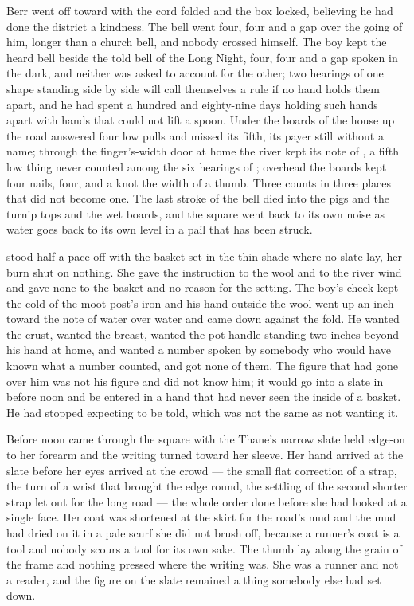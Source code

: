 Berr went off toward  with the cord folded and the box locked, believing he had done the district a kindness. The bell went four, four and a gap over the going of him, longer than a church bell, and nobody crossed himself. The boy kept the heard bell beside the told bell of the Long Night, four, four and a gap spoken in the dark, and neither was asked to account for the other; two hearings of one shape standing side by side will call themselves a rule if no hand holds them apart, and he had spent a hundred and eighty-nine days holding such hands apart with hands that could not lift a spoon. Under the boards of the house up the road  answered four low pulls and missed its fifth, its payer still without a name; through the finger's-width door at home the river kept its note of , a fifth low thing never counted among the six hearings of ; overhead the boards kept four nails, four, and a knot the width of a thumb. Three counts in three places that did not become one. The last stroke of the bell died into the pigs and the turnip tops and the wet boards, and the square went back to its own noise as water goes back to its own level in a pail that has been struck.

 stood half a pace off with the basket set in the thin shade where no slate lay, her burn shut on nothing. She gave the instruction to the wool and to the river wind and gave none to the basket and no reason for the setting. The boy's cheek kept the cold of the moot-post's iron and his hand outside the wool went up an inch toward the note of water over water and came down against the fold. He wanted the crust, wanted the breast, wanted the pot handle standing two inches beyond his hand at home, and wanted a number spoken by somebody who would have known what a number counted, and got none of them. The figure that had gone over him was not his figure and did not know him; it would go into a slate in  before noon and be entered in a hand that had never seen the inside of a basket. He had stopped expecting to be told, which was not the same as not wanting it.

\scenebreak

Before noon  came through the square with the Thane's narrow slate held edge-on to her forearm and the writing turned toward her sleeve. Her hand arrived at the slate before her eyes arrived at the crowd --- the small flat correction of a strap, the turn of a wrist that brought the edge round, the settling of the second shorter strap let out for the long road --- the whole order done before she had looked at a single face. Her coat was shortened at the skirt for the road's mud and the mud had dried on it in a pale scurf she did not brush off, because a runner's coat is a tool and nobody scours a tool for its own sake. The thumb lay along the grain of the frame and nothing pressed where the writing was. She was a runner and not a reader, and the figure on the slate remained a thing somebody else had set down.

